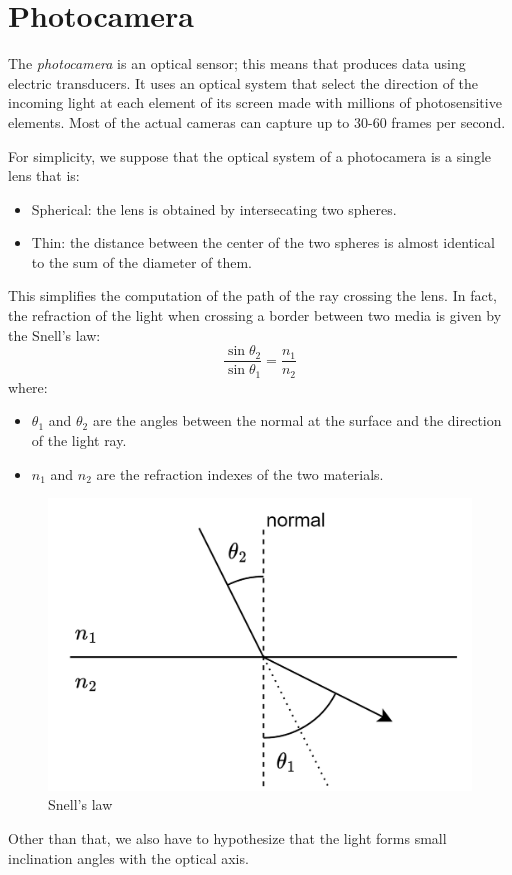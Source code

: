 \documentclass[12pt, a4paper]{report}
\newtheorem[style=M,bodystyle=\normalfont]{theorem}{Theorem}
\newtheorem[style=M,bodystyle=\normalfont]{corollary}{Corollary}
\newtheorem[style=M,bodystyle=\normalfont]{lemma}{Lemma}
\newtheorem[style=M,bodystyle=\normalfont]{definition}{Definition}
\begin{document}
    \section{Photocamera}
    \begin{definition}
    The \emph{photocamera} is an optical sensor; this means that produces data using electric transducers. It uses an optical system that select the direction of the incoming light at each 
    element of its screen made with millions of photosensitive elements. Most of the actual cameras can capture up to 30-60 frames per second. 
    \end{definition}
    For simplicity, we suppose that the optical system of a photocamera is a single lens that is:
    \begin{itemize}
        \item Spherical: the lens is obtained by intersecating two spheres. 
        \item Thin: the distance between the center of the two spheres is almost identical to the sum of the diameter of them. 
    \end{itemize}
    This simplifies the computation of the path of the ray crossing the lens. In fact, the refraction of the light when crossing a border between two media is given by the Snell's law: 
    \[\dfrac{\sin{\theta_2}}{\sin{\theta_1}}=\dfrac{n_1}{n_2}\]
    where: 
    \begin{itemize}
        \item $\theta_1$ and $\theta_2$ are the angles between the normal at the surface and the direction of the light ray. 
        \item $n_1$ and $n_2$ are the refraction indexes of the two materials.
    \end{itemize}
    \begin{figure}[H]
        \centering
        \includegraphics[width=0.5\linewidth]{images/refraction.png}
        \caption{Snell's law}
    \end{figure}
    Other than that, we also have to hypothesize that the light forms small inclination angles with the optical axis.
\end{document}
